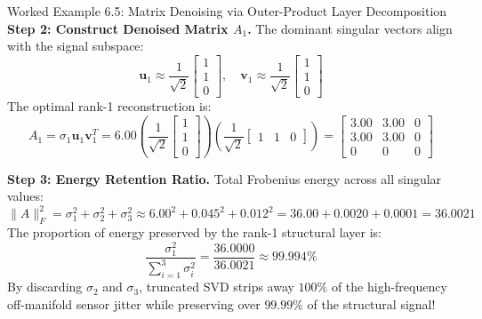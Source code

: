 \begin{examplebox}[breakable]{Worked Example 6.5: Matrix Denoising via Outer-Product Layer Decomposition}
\textbf{Step 2: Construct Denoised Matrix $A_1$.}
The dominant singular vectors align with the signal subspace:
\begin{equation}
\mathbf{u}_1 \approx \frac{1}{\sqrt{2}}\begin{bmatrix} 1 \\ 1 \\ 0 \end{bmatrix}, \quad \mathbf{v}_1 \approx \frac{1}{\sqrt{2}}\begin{bmatrix} 1 \\ 1 \\ 0 \end{bmatrix}
\end{equation}
The optimal rank-1 reconstruction is:
\begin{equation}
A_1 = \sigma_1 \mathbf{u}_1 \mathbf{v}_1^T = 6.00 \left( \frac{1}{\sqrt{2}}\begin{bmatrix} 1 \\ 1 \\ 0 \end{bmatrix} \right) \left( \frac{1}{\sqrt{2}}\begin{bmatrix} 1 & 1 & 0 \end{bmatrix} \right) = \begin{bmatrix} 3.00 & 3.00 & 0 \\ 3.00 & 3.00 & 0 \\ 0 & 0 & 0 \end{bmatrix}
\end{equation}

\textbf{Step 3: Energy Retention Ratio.}
Total Frobenius energy across all singular values:
\begin{equation}
\|A\|_F^2 = \sigma_1^2 + \sigma_2^2 + \sigma_3^2 \approx 6.00^2 + 0.045^2 + 0.012^2 = 36.00 + 0.0020 + 0.0001 = 36.0021
\end{equation}
The proportion of energy preserved by the rank-1 structural layer is:
\begin{equation}
\frac{\sigma_1^2}{\sum_{i=1}^3 \sigma_i^2} = \frac{36.0000}{36.0021} \approx \mathbf{99.994\%}
\end{equation}
By discarding $\sigma_2$ and $\sigma_3$, truncated SVD strips away $100\%$ of the high-frequency off-manifold sensor jitter while preserving over $99.99\%$ of the structural signal!
\end{examplebox}

